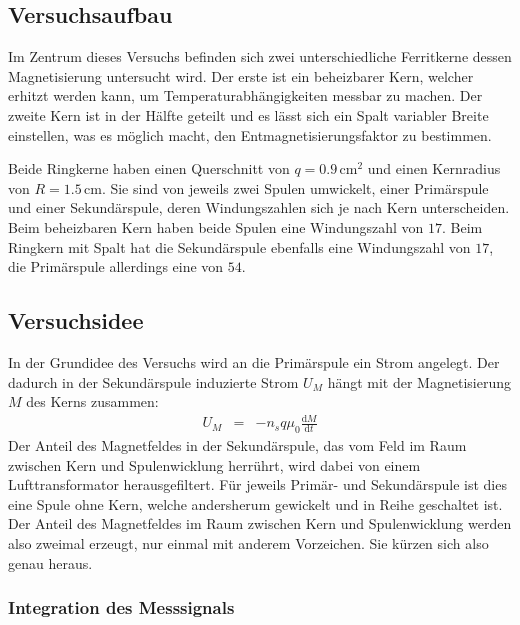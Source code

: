 \documentclass[12pt,a4paper]{scrartcl}
\numberwithin{equation}{section} %
\renewcommand{\[}{} %
\renewcommand{\]}{\noindent} %
\begin{document}
\hypertarget{versuchsaufbau}{%
\subsection{Versuchsaufbau}\label{versuchsaufbau}}

Im Zentrum dieses Versuchs befinden sich zwei unterschiedliche
Ferritkerne dessen Magnetisierung untersucht wird. Der erste ist ein
beheizbarer Kern, welcher erhitzt werden kann, um
Temperaturabhängigkeiten messbar zu machen. Der zweite Kern ist in der
Hälfte geteilt und es lässt sich ein Spalt variabler Breite einstellen,
was es möglich macht, den Entmagnetisierungsfaktor zu bestimmen.

Beide Ringkerne haben einen Querschnitt von \(q=0.9\,\mathrm{cm^2}\) und
einen Kernradius von \(R=1.5\,\mathrm{cm}\). Sie sind von jeweils zwei
Spulen umwickelt, einer Primärspule und einer Sekundärspule, deren
Windungszahlen sich je nach Kern unterscheiden. Beim beheizbaren Kern
haben beide Spulen eine Windungszahl von \(17\). Beim Ringkern mit Spalt
hat die Sekundärspule ebenfalls eine Windungszahl von \(17\), die
Primärspule allerdings eine von \(54\).

\hypertarget{versuchsidee}{%
\subsection{Versuchsidee}\label{versuchsidee}}

In der Grundidee des Versuchs wird an die Primärspule ein Strom
angelegt. Der dadurch in der Sekundärspule induzierte Strom \(U_M\)
hängt mit der Magnetisierung \(M\) des Kerns zusammen: \[
\begin{eqnarray}
    U_M &=& -n_s q \mu_0 \frac{\mathrm dM}{\mathrm dt}
\end{eqnarray}
\] Der Anteil des Magnetfeldes in der Sekundärspule, das vom Feld im
Raum zwischen Kern und Spulenwicklung herrührt, wird dabei von einem
Lufttransformator herausgefiltert. Für jeweils Primär- und Sekundärspule
ist dies eine Spule ohne Kern, welche andersherum gewickelt und in Reihe
geschaltet ist. Der Anteil des Magnetfeldes im Raum zwischen Kern und
Spulenwicklung werden also zweimal erzeugt, nur einmal mit anderem
Vorzeichen. Sie kürzen sich also genau heraus.

\hypertarget{integration-des-messsignals}{%
\subsubsection{Integration des
Messsignals}\label{integration-des-messsignals}}
\end{document}
